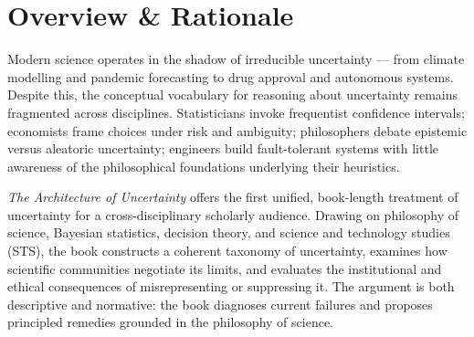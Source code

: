\section{Overview \& Rationale}

Modern science operates in the shadow of irreducible uncertainty — from climate modelling and pandemic forecasting to drug approval and autonomous systems. Despite this, the conceptual vocabulary for reasoning about uncertainty remains fragmented across disciplines. Statisticians invoke frequentist confidence intervals; economists frame choices under risk and ambiguity; philosophers debate epistemic versus aleatoric uncertainty; engineers build fault-tolerant systems with little awareness of the philosophical foundations underlying their heuristics.

\textit{The Architecture of Uncertainty} offers the first unified, book-length treatment of uncertainty for a cross-disciplinary scholarly audience. Drawing on philosophy of science, Bayesian statistics, decision theory, and science and technology studies (STS), the book constructs a coherent taxonomy of uncertainty, examines how scientific communities negotiate its limits, and evaluates the institutional and ethical consequences of misrepresenting or suppressing it. The argument is both descriptive and normative: the book diagnoses current failures and proposes principled remedies grounded in the philosophy of science.

